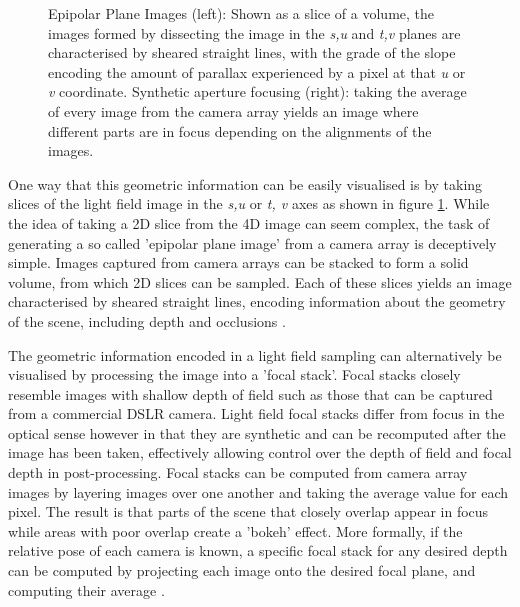 \documentclass[openany]{book}
\begin{document}
\begin{figure}[tbp]
    \caption{Epipolar Plane Images (left): Shown as a slice of a volume, the images formed by dissecting the image in the \textit{s,u} and \textit{t,v} planes are characterised by sheared straight lines, with the grade of the slope encoding the amount of parallax experienced by a pixel at that \textit{u} or \textit{v} coordinate. Synthetic aperture focusing (right): taking the average of every image from the camera array yields an image where different parts are in focus depending on the alignments of the images.}
    \label{epiplaneimg}
\end{figure}


One way that this geometric information can be easily visualised is by taking slices of the light field image in the \textit{s,u} or \textit{t, v} axes as shown in figure \ref{epiplaneimg}. While the idea of taking a 2D slice from the 4D image can seem complex, the task of generating a so called 'epipolar plane image' from a camera array is deceptively simple. Images captured from camera arrays can be stacked to form a solid volume, from which 2D slices can be sampled. Each of these slices yields an image characterised by sheared straight lines, encoding information about the geometry of the scene, including depth and occlusions \cite{bolles1987epiplane}. 

The geometric information encoded in a light field sampling can alternatively be visualised by processing the image into a 'focal stack'. Focal stacks closely resemble images with shallow depth of field such as those that can be captured from a commercial DSLR camera. Light field focal stacks differ from focus in the optical sense however in that they are synthetic and can be recomputed after the image has been taken, effectively allowing control over the depth of field and focal depth in post-processing. Focal stacks can be computed from camera array images by layering images over one another and taking the average value for each pixel. The result is that parts of the scene that closely overlap appear in focus while areas with poor overlap create a 'bokeh' effect. More formally, if the relative pose of each camera is known, a specific focal stack for any desired depth can be computed by projecting each image onto the desired focal plane, and computing their average \cite{vaish2004parallax}.
\end{document}
